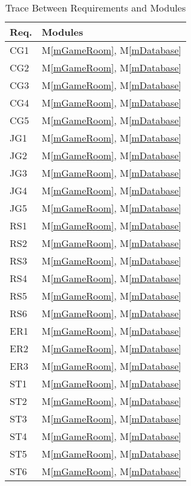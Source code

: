 \documentclass[12pt, titlepage]{article}
\newcommand{\mref}[1]{M\ref{#1}}
\begin{document}
\begin{table}[H]
\centering
\begin{tabular}{p{} p{}}
\toprule
\textbf{Req.} & \textbf{Modules}\\
\midrule
CG1 & \mref{mGameRoom}, \mref{mDatabase}\\
CG2 & \mref{mGameRoom}, \mref{mDatabase}\\
CG3 & \mref{mGameRoom}, \mref{mDatabase}\\
CG4 & \mref{mGameRoom}, \mref{mDatabase}\\
CG5 & \mref{mGameRoom}, \mref{mDatabase}\\
JG1 & \mref{mGameRoom}, \mref{mDatabase}\\
JG2 & \mref{mGameRoom}, \mref{mDatabase}\\
JG3 & \mref{mGameRoom}, \mref{mDatabase}\\
JG4 & \mref{mGameRoom}, \mref{mDatabase}\\
JG5 & \mref{mGameRoom}, \mref{mDatabase}\\
RS1 & \mref{mGameRoom}, \mref{mDatabase}\\
RS2 & \mref{mGameRoom}, \mref{mDatabase}\\
RS3 & \mref{mGameRoom}, \mref{mDatabase}\\
RS4 & \mref{mGameRoom}, \mref{mDatabase}\\
RS5 & \mref{mGameRoom}, \mref{mDatabase}\\
RS6 & \mref{mGameRoom}, \mref{mDatabase}\\
ER1 & \mref{mGameRoom}, \mref{mDatabase}\\
ER2 & \mref{mGameRoom}, \mref{mDatabase}\\
ER3 & \mref{mGameRoom}, \mref{mDatabase}\\
ST1 & \mref{mGameRoom}, \mref{mDatabase}\\
ST2 & \mref{mGameRoom}, \mref{mDatabase}\\
ST3 & \mref{mGameRoom}, \mref{mDatabase}\\
ST4 & \mref{mGameRoom}, \mref{mDatabase}\\
ST5 & \mref{mGameRoom}, \mref{mDatabase}\\
ST6 & \mref{mGameRoom}, \mref{mDatabase}\\
\bottomrule
\end{tabular}
\caption{Trace Between Requirements and Modules}
\label{TblRT}
\end{table}
\end{document}

